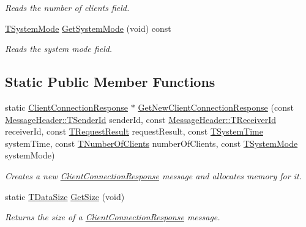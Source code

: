 \begin{DoxyCompactItemize}
\begin{DoxyCompactList}\small\item\em Reads the number of clients field. \end{DoxyCompactList}\item 
\hyperlink{class_terra_swarm_1_1_asynchronous_1_1_client_connection_response_ac34facba96c97e6897a1abd5ddd09159}{T\-System\-Mode} \hyperlink{class_terra_swarm_1_1_asynchronous_1_1_client_connection_response_a60cb414aaa5b3b7c27c461e1b993b9c5}{Get\-System\-Mode} (void) const 
\begin{DoxyCompactList}\small\item\em Reads the system mode field. \end{DoxyCompactList}\end{DoxyCompactItemize}
\subsection*{Static Public Member Functions}
\begin{DoxyCompactItemize}
\item 
static \hyperlink{class_terra_swarm_1_1_asynchronous_1_1_client_connection_response}{Client\-Connection\-Response} $\ast$ \hyperlink{class_terra_swarm_1_1_asynchronous_1_1_client_connection_response_a5ecdefe1ecb557a0086f11f817db793d}{Get\-New\-Client\-Connection\-Response} (const \hyperlink{class_terra_swarm_1_1_message_header_a516b36855e2aad7cfbf8770f1b42784f}{Message\-Header\-::\-T\-Sender\-Id} sender\-Id, const \hyperlink{class_terra_swarm_1_1_message_header_aa3260702b182b6f88ddbdd3416e98df0}{Message\-Header\-::\-T\-Receiver\-Id} receiver\-Id, const \hyperlink{class_terra_swarm_1_1_asynchronous_1_1_client_connection_response_a55a4d4527b877bde0e74da223157a62a}{T\-Request\-Result} request\-Result, const \hyperlink{class_terra_swarm_1_1_asynchronous_1_1_client_connection_response_ac32ae5e652874b024aae5ed2f816c155}{T\-System\-Time} system\-Time, const \hyperlink{class_terra_swarm_1_1_asynchronous_1_1_client_connection_response_a0780de58d62395a3cce207fe96e43ccc}{T\-Number\-Of\-Clients} number\-Of\-Clients, const \hyperlink{class_terra_swarm_1_1_asynchronous_1_1_client_connection_response_ac34facba96c97e6897a1abd5ddd09159}{T\-System\-Mode} system\-Mode)
\begin{DoxyCompactList}\small\item\em Creates a new \hyperlink{class_terra_swarm_1_1_asynchronous_1_1_client_connection_response}{Client\-Connection\-Response} message and allocates memory for it. \end{DoxyCompactList}\item 
static \hyperlink{namespace_terra_swarm_a092e6ec9739175076ae3106783f5c1b6}{T\-Data\-Size} \hyperlink{class_terra_swarm_1_1_asynchronous_1_1_client_connection_response_ac5f405bd7621098cd4ca8d61242168ce}{Get\-Size} (void)
\begin{DoxyCompactList}\small\item\em Returns the size of a \hyperlink{class_terra_swarm_1_1_asynchronous_1_1_client_connection_response}{Client\-Connection\-Response} message. \end{DoxyCompactList}\end{DoxyCompactItemize}
